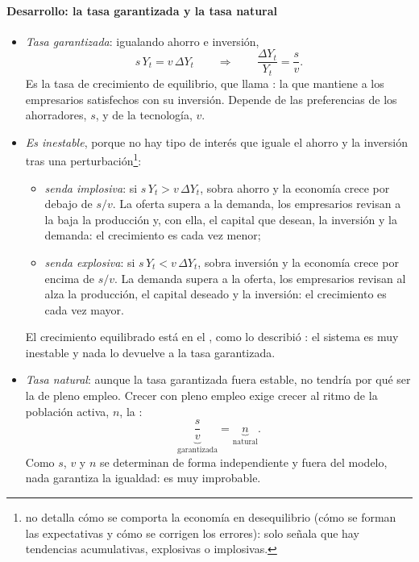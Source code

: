 \documentclass[11pt]{article}
\begin{document}
\paragraph{Desarrollo: la tasa garantizada y la tasa natural}

\begin{itemize}
\item \emph{Tasa garantizada}: igualando ahorro e inversión,
  \[s\,Y_t=v\,\Delta Y_t\qquad\Longrightarrow\qquad\frac{\Delta Y_t}{Y_t}=\frac{s}{v}.\]
  Es la tasa de crecimiento de equilibrio, que  llama : la que mantiene a los empresarios satisfechos con su inversión. Depende de las preferencias de los ahorradores, $s$, y de la tecnología, $v$.
\item \emph{Es inestable}, porque no hay tipo de interés que iguale el ahorro y la inversión tras una perturbación\footnote{ no detalla cómo se comporta la economía en desequilibrio (cómo se forman las expectativas y cómo se corrigen los errores): solo señala que hay tendencias acumulativas, explosivas o implosivas.}:
  \begin{itemize}
  \item \emph{senda implosiva}: si $s\,Y_t>v\,\Delta Y_t$, sobra ahorro y la economía crece por debajo de $s/v$. La oferta supera a la demanda, los empresarios revisan a la baja la producción y, con ella, el capital que desean, la inversión y la demanda: el crecimiento es cada vez menor;
  \item \emph{senda explosiva}: si $s\,Y_t<v\,\Delta Y_t$, sobra inversión y la economía crece por encima de $s/v$. La demanda supera a la oferta, los empresarios revisan al alza la producción, el capital deseado y la inversión: el crecimiento es cada vez mayor.
  \end{itemize}
  El crecimiento equilibrado está en el , como lo describió \textcite[p.~65]{Solow1956}: el sistema es muy inestable y nada lo devuelve a la tasa garantizada.
\item \emph{Tasa natural}: aunque la tasa garantizada fuera estable, no tendría por qué ser la de pleno empleo. Crecer con pleno empleo exige crecer al ritmo de la población activa, $n$, la :
  \[\underbrace{\frac{s}{v}}_{\text{garantizada}}=\underbrace{n}_{\text{natural}}.\]
  Como $s$, $v$ y $n$ se determinan de forma independiente y fuera del modelo, nada garantiza la igualdad: es muy improbable.
\end{itemize}
\end{document}
